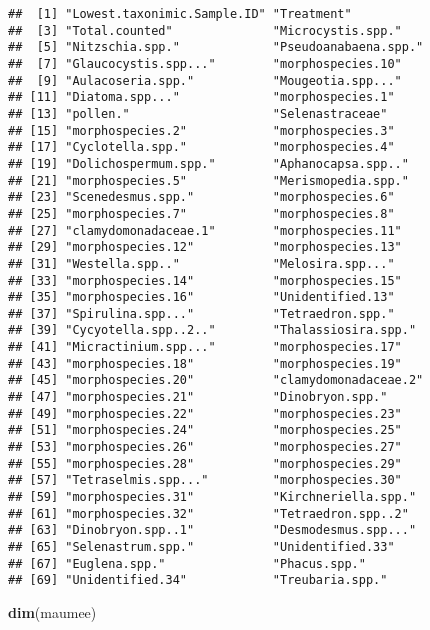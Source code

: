 \documentclass[]{article}
\newenvironment{Shaded}{\begin{snugshade}}{\end{snugshade}}
\newcommand{\KeywordTok}[1]{\textcolor[rgb]{0.13,0.29,0.53}{\textbf{#1}}}
\newcommand{\NormalTok}[1]{#1}
\begin{document}
\begin{verbatim}
##  [1] "Lowest.taxonimic.Sample.ID" "Treatment"                 
##  [3] "Total.counted"              "Microcystis.spp."          
##  [5] "Nitzschia.spp."             "Pseudoanabaena.spp."       
##  [7] "Glaucocystis.spp..."        "morphospecies.10"          
##  [9] "Aulacoseria.spp."           "Mougeotia.spp..."          
## [11] "Diatoma.spp..."             "morphospecies.1"           
## [13] "pollen."                    "Selenastraceae"            
## [15] "morphospecies.2"            "morphospecies.3"           
## [17] "Cyclotella.spp."            "morphospecies.4"           
## [19] "Dolichospermum.spp."        "Aphanocapsa.spp.."         
## [21] "morphospecies.5"            "Merismopedia.spp."         
## [23] "Scenedesmus.spp."           "morphospecies.6"           
## [25] "morphospecies.7"            "morphospecies.8"           
## [27] "clamydomonadaceae.1"        "morphospecies.11"          
## [29] "morphospecies.12"           "morphospecies.13"          
## [31] "Westella.spp.."             "Melosira.spp..."           
## [33] "morphospecies.14"           "morphospecies.15"          
## [35] "morphospecies.16"           "Unidentified.13"           
## [37] "Spirulina.spp..."           "Tetraedron.spp."           
## [39] "Cycyotella.spp..2.."        "Thalassiosira.spp."        
## [41] "Micractinium.spp..."        "morphospecies.17"          
## [43] "morphospecies.18"           "morphospecies.19"          
## [45] "morphospecies.20"           "clamydomonadaceae.2"       
## [47] "morphospecies.21"           "Dinobryon.spp."            
## [49] "morphospecies.22"           "morphospecies.23"          
## [51] "morphospecies.24"           "morphospecies.25"          
## [53] "morphospecies.26"           "morphospecies.27"          
## [55] "morphospecies.28"           "morphospecies.29"          
## [57] "Tetraselmis.spp..."         "morphospecies.30"          
## [59] "morphospecies.31"           "Kirchneriella.spp."        
## [61] "morphospecies.32"           "Tetraedron.spp..2"         
## [63] "Dinobryon.spp..1"           "Desmodesmus.spp..."        
## [65] "Selenastrum.spp."           "Unidentified.33"           
## [67] "Euglena.spp."               "Phacus.spp."               
## [69] "Unidentified.34"            "Treubaria.spp."
\end{verbatim}

\begin{Shaded}
\begin{Highlighting}[]
\KeywordTok{dim}\NormalTok{(maumee)}
\end{Highlighting}
\end{Shaded}
\end{document}
